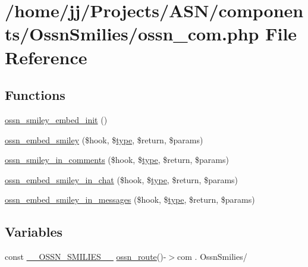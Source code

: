 \hypertarget{_ossn_smilies_2ossn__com_8php}{}\section{/home/jj/\+Projects/\+A\+S\+N/components/\+Ossn\+Smilies/ossn\+\_\+com.php File Reference}
\label{_ossn_smilies_2ossn__com_8php}
\subsection*{Functions}
\begin{DoxyCompactItemize}
\item 
\hyperlink{_ossn_smilies_2ossn__com_8php_a8d504ba011c80437de4bcb36e725628c}{ossn\+\_\+smiley\+\_\+embed\+\_\+init} ()
\item 
\hyperlink{_ossn_smilies_2ossn__com_8php_ad6db6bde9064562b999a6af45a3e4e3d}{ossn\+\_\+embed\+\_\+smiley} (\$hook, \$\hyperlink{_ossn_wall_2actions_2wall_2post_2group_8php_a2dc1bb4e1ed0029daa81ac0776b14b51}{type}, \$return, \$params)
\item 
\hyperlink{_ossn_smilies_2ossn__com_8php_a4dff653251fbc3a14a98acf535f47da8}{ossn\+\_\+smiley\+\_\+in\+\_\+comments} (\$hook, \$\hyperlink{_ossn_wall_2actions_2wall_2post_2group_8php_a2dc1bb4e1ed0029daa81ac0776b14b51}{type}, \$return, \$params)
\item 
\hyperlink{_ossn_smilies_2ossn__com_8php_a082b38db1da1772f8ec61ea17c13d5f8}{ossn\+\_\+embed\+\_\+smiley\+\_\+in\+\_\+chat} (\$hook, \$\hyperlink{_ossn_wall_2actions_2wall_2post_2group_8php_a2dc1bb4e1ed0029daa81ac0776b14b51}{type}, \$return, \$params)
\item 
\hyperlink{_ossn_smilies_2ossn__com_8php_aad7b1e050a0b27abaebf2d5fd2b9f3ba}{ossn\+\_\+embed\+\_\+smiley\+\_\+in\+\_\+messages} (\$hook, \$\hyperlink{_ossn_wall_2actions_2wall_2post_2group_8php_a2dc1bb4e1ed0029daa81ac0776b14b51}{type}, \$return, \$params)
\end{DoxyCompactItemize}
\subsection*{Variables}
\begin{DoxyCompactItemize}
\item 
const \hyperlink{_ossn_smilies_2ossn__com_8php_ab7b721afe7de55448c09c4c5015c4b59}{\+\_\+\+\_\+\+O\+S\+S\+N\+\_\+\+S\+M\+I\+L\+I\+E\+S\+\_\+\+\_\+} \hyperlink{ossn_8lib_8route_8php_ac23dc424aa33dcd57982b72f4ed1217e}{ossn\+\_\+route}()-\/$>$com . \textquotesingle{}Ossn\+Smilies/\textquotesingle{}
\end{DoxyCompactItemize}


